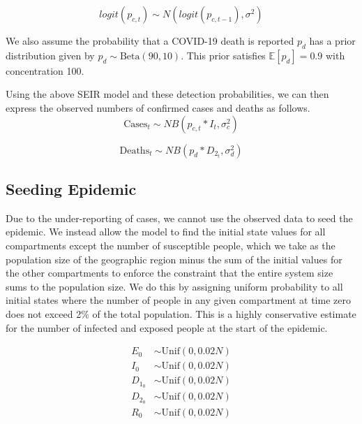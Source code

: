 \documentclass[11pt]{amsart}
\newcommand{\Unif}{\text{Unif}}
\newcommand{\Beta}{\text{Beta}}
\newcommand{\E}{\mathbb{E}}
\begin{document}
\begin{equation}
logit(p_{c,t}) \sim N(logit(p_{c,t-1}), \sigma^2)
\end{equation}

We also assume the probability that a COVID-19 death is reported $p_d$ has a prior distribution given by  $p_d \sim \Beta(90, 10)$. This prior satisfies $\E[p_d] = 0.9$ with concentration 100.

 


Using the above SEIR model and these detection probabilities, we can then express the observed numbers of confirmed cases and deaths as follows.
\begin{equation}
\text{Cases}_{t} \sim NB(p_{c,t}*I_{t},\sigma_{c}^2)
\end{equation}

\begin{equation}
\text{Deaths}_{t} \sim NB(p_d*D_{2_{t}}, \sigma_d^2)
\end{equation}


%

\subsection{Seeding Epidemic}
Due to the under-reporting of cases, we cannot use the observed data to seed the epidemic. We instead allow the model to find the initial state values for all compartments except the number of susceptible people, which we take as the population size of the geographic region minus the sum of the initial values for the other compartments to enforce the constraint that the entire system size sums to the population size. We do this by assigning uniform probability to all initial states where the number of people in any given compartment at time zero does not exceed 2\% of the total population. This is a highly conservative estimate for the number of infected and exposed people at the start of the epidemic. 


\begin{align*}
 E_0 &\sim \Unif(0, 0.02 N) \\
I_0 &\sim \Unif(0, 0.02 N) \\
  D_{1_0} &\sim \Unif(0, 0.02 N) \\
   D_{2_0} &\sim \Unif(0, 0.02 N) \\   
   R_{0} &\sim \Unif(0, 0.02 N) \\   
\end{align*}
\end{document}
